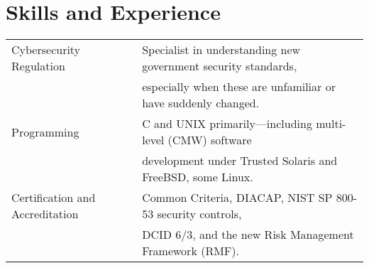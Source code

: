 \section*{Skills and Experience}

\vspace{-2mm}

\begin{tabular}{ll}
    Cybersecurity Regulation & Specialist in understanding new government
        security standards, \\
        & especially when these are unfamiliar or have suddenly changed.
            \vspace{2mm} \\

    Programming & C and UNIX primarily---including multi-level (CMW) software \\
        & development under Trusted Solaris and FreeBSD, some Linux. \vspace{2mm} \\

    Certification and Accreditation & Common Criteria, DIACAP, NIST SP 800-53 security controls, \\
         & DCID 6/3, and the new Risk Management Framework (RMF). \\
\end{tabular}

